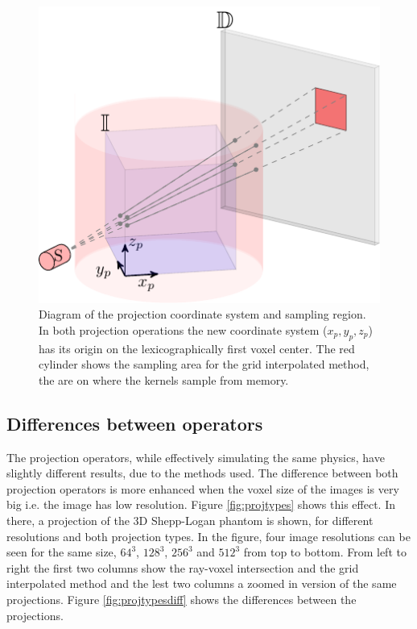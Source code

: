\begin{figure}
\begin{center}

\includegraphics{GPUmethods/projcoord-figure0.pdf} 
\end{center}

\caption{\label{fig:projcoord} Diagram of the projection coordinate system and sampling region. In both projection operations the new coordinate system ($x_p,y_p,z_p$) has its origin on the lexicographically first voxel center. The red cylinder shows the sampling area for the grid interpolated method, the are on where the kernels sample from memory.} 
\end{figure}
\subsection{Differences between operators}

The projection operators, while effectively simulating the same physics, have slightly different results, due to the methods used. The difference between both projection operators is more enhanced when the voxel size of the images is very big i.e. the image has low resolution. Figure \ref{fig:projtypes} shows this effect. In there, a projection of the 3D Shepp-Logan phantom is shown, for different resolutions and both projection types. In the figure, four image resolutions can be seen for the same size, $64^3$, $128^3$, $256^3$ and $512^3$ from top to bottom. From left to right the first two columns show the ray-voxel intersection and the grid interpolated method and the lest two columns a zoomed in version of the same projections. Figure \ref{fig:projtypesdiff} shows the differences between the projections.

